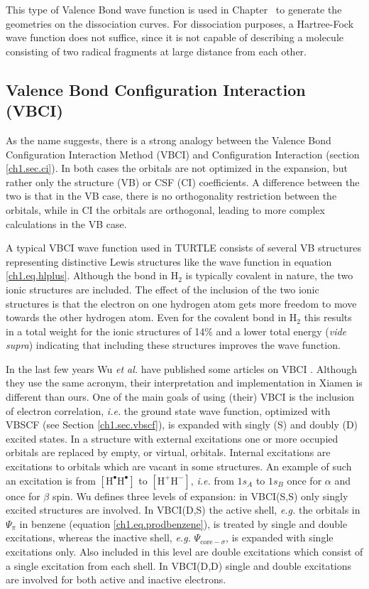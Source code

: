 This type of Valence Bond wave function is used in Chapter \chdissociation\ to generate the geometries on the dissociation curves. For dissociation purposes, a Hartree-Fock wave function does not suffice, since it is not capable of describing a molecule consisting of two radical fragments at large distance from each other.

\subsection{Valence Bond Configuration Interaction (VBCI)}

As the name suggests, there is a strong analogy between the Valence Bond Configuration Interaction Method (VBCI) and Configuration Interaction (section \ref{ch1.sec.ci}). In both cases the orbitals are not optimized in the expansion, but rather only the structure (VB) or CSF (CI) coefficients. A difference between the two is that in the VB case, there is no orthogonality restriction between the orbitals, while in CI the orbitals are orthogonal, leading to more complex calculations in the VB case.

A typical VBCI wave function used in TURTLE consists of several VB structures representing distinctive Lewis structures like the wave function in equation \ref{ch1.eq.hlplus}. Although the bond in H$_2$ is typically covalent in nature, the two ionic structures are included. The effect of the inclusion of the two ionic structures is that the electron on one hydrogen atom gets more freedom to move towards the other hydrogen atom. Even for the covalent bond in H$_2$ this results in a total weight for the ionic structures of 14\% and a lower total energy (\textit{vide supra}) indicating that including these structures improves the wave function.

In the last few years Wu \textit{et al.} have published some articles on VBCI \cite{vbci_wu1,vbci_wu2}. Although they use the same acronym, their interpretation and implementation in Xiamen \cite{xiamen} is different than ours. One of the main goals of using (their) VBCI is the inclusion of electron correlation, \textit{i.e.} the ground state wave function, optimized with VBSCF (see Section \ref{ch1.sec.vbscf}), is expanded with singly (S) and doubly (D) excited states. In a structure with external excitations one or more occupied orbitals are replaced by empty, or virtual, orbitals. Internal excitations are excitations to orbitals which are vacant in some structures. An example of such an excitation is from $\mathrm{[H^\bullet H^\bullet]}$ to $\mathrm{[H^{+} H^{-}]}$, \textit{i.e.} from $1s_A$ to $1s_B$ once for $\alpha$ and once for $\beta$ spin. Wu defines three levels of expansion: in VBCI(S,S) only singly excited structures are involved. In VBCI(D,S) the active shell, \textit{e.g.} the orbitals in $\Psi_{\pi}$ in benzene (equation \ref{ch1.eq.prodbenzene}), is treated by single and double excitations, whereas the inactive shell, \textit{e.g.} $\Psi_{\mathrm{core}-\sigma}$, is expanded with single excitations only. Also included in this level are double excitations which consist of a single excitation from each shell. In VBCI(D,D) single and double excitations are involved for both active and inactive electrons.

